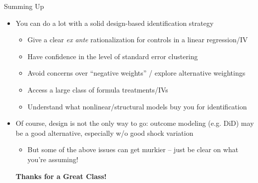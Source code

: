 \documentclass[11pt,english]{beamer}
\begin{document}
\begin{frame}{Summing Up}
\begin{itemize}
\item You can do a lot with a solid design-based identification strategy\smallskip
\begin{itemize}
\item Give a clear \emph{ex ante} rationalization for controls in a linear regression/IV\smallskip
\item Have confidence in the level of standard error clustering\smallskip
\item Avoid concerns over ``negative weights'' / explore alternative weightings\smallskip
\item Access a large class of formula treatments/IVs\smallskip
\item Understand what nonlinear/structural models buy you for identification
\end{itemize}\bigskip\pause{}
\item Of course, design is not the only way to go: outcome modeling (e.g. DiD) may be a good alternative, especially w/o good shock variation\smallskip
\begin{itemize}
\item But some of the above issues can get murkier -- just be clear on what you're assuming!
\end{itemize}\bigskip\pause{}

\begin{center}
\textbf{Thanks for a Great Class!}
\end{center}
\end{itemize}

\end{frame}
\end{document}
